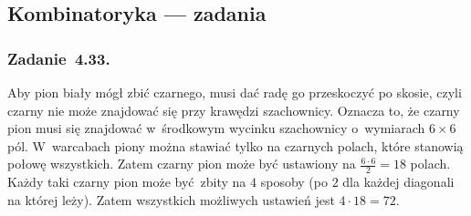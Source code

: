 \subsection*{Kombinatoryka --- zadania}
\subsubsection*{Zadanie~4.33.}
Aby pion biały mógł zbić czarnego, musi dać radę go przeskoczyć po skosie, czyli czarny nie może znajdować się przy krawędzi szachownicy. Oznacza to, że czarny pion musi się znajdować w~środkowym wycinku szachownicy o~wymiarach \(6 \times 6\) pól. W~warcabach piony można stawiać tylko na czarnych polach, które stanowią połowę wszystkich. Zatem czarny pion może być ustawiony na \(\frac{6 \cdot 6}{2} = 18\) polach. Każdy taki czarny pion może być zbity na \(4\) sposoby (po \(2\) dla każdej diagonali na której leży). Zatem wszystkich możliwych ustawień jest \(4 \cdot 18 = 72\).
